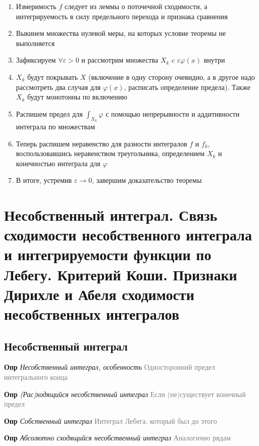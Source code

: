 \documentclass[a4paper, 14pt]{article}
\begin{document}
    \begin{enumerate}
        \item Измеримость $f$ следует из леммы о поточечной сходимости, а интегрируемость в силу предельного перехода и
        признака сравнения
        \item Выкинем множества нулевой меры, на которых условие теоремы не выполняется
        \item Зафиксируем $\forall \varepsilon > 0$ и рассмотрим множества $X_k$ c $\varepsilon \varphi(x)$ внутри
        \item $X_k$ будут покрывать $X$ (включение в одну сторону очевидно, а в другое надо рассмотреть два случая
        для $\varphi(x)$, расписать определение предела).
        Также $X_k$ будут монотонны по включению
        \item Распишем предел для $\int_{X_k} \varphi$ с помощью непрерывности и аддитивности интеграла по множествам
        \item Теперь распишем неравенство для разности интегралов $f$ и $f_k$, воспользовавшись неравенством
        треугольника, определением $X_k$ и конечностью интеграла для $\varphi$
        \item В итоге, устремив $\varepsilon \rightarrow 0$, завершим доказательство теоремы
    \end{enumerate}

    \section{Несобственный интеграл.
    Связь сходимости несобственного интеграла и интегрируемости функции по Лебегу.
    Критерий Коши.
    Признаки Дирихле и Абеля сходимости несобственных интегралов}

    \subsection{Несобственный интеграл}

    \textbf{Опр} \textit{Несобственный интеграл, особенность} \textcolor{gray}{Односторонний предел интегрального конца}

    \textbf{Опр} \textit{(Рас)ходящийся несобственный интеграл} \textcolor{gray}{Если (не)существует конечный предел}

    \textbf{Опр} \textit{Собственный интеграл} \textcolor{gray}{Интеграл Лебега, который был до этого}

    \textbf{Опр} \textit{Абсолютно сходящийся несобственный интеграл} \textcolor{gray}{Аналогично рядам}
\end{document}
